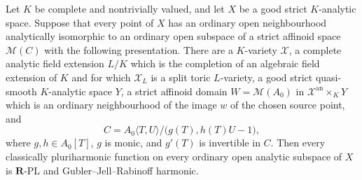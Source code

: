 
\begin{corollary}
\label{cor:p061-analytic-standard-etale-algebraic-split-forms}
Let \(K\) be complete and nontrivially valued, and let \(X\) be a good
strict \(K\)-analytic space.  Suppose that every point of \(X\) has an
ordinary open neighbourhood analytically isomorphic to an ordinary open
subspace of a strict affinoid space \(\mathcal M(C)\) with the following
presentation.  There are a \(K\)-variety \(\mathcal X\), a complete analytic
field extension \(L/K\) which is the completion of an algebraic field
extension of \(K\) and for which \(\mathcal X_L\) is a split toric
\(L\)-variety, a good strict quasi-smooth \(K\)-analytic space \(Y\), a
strict affinoid domain \(W=\mathcal M(A_0)\) in
\(\mathcal X^{\mathrm{an}}\times_KY\) which is an ordinary neighbourhood
of the image \(w\) of the chosen source point, and
\[
 C=A_0\langle T,U\rangle/
      \bigl(g(T),h(T)U-1\bigr),
\]
where \(g,h\in A_0[T]\), \(g\) is monic, and \(g'(T)\) is invertible in
\(C\).  Then every classically pluriharmonic function on every ordinary
open analytic subspace of \(X\) is \(\mathbf R\)-PL and
Gubler--Jell--Rabinoff harmonic.
\end{corollary}
